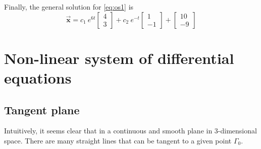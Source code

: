 \begin{solution}
    Finally, the general solution for \eqref{eq:os1} is 
    \begin{equation*}
        \overrightarrow{\mathbf{x}} = c_1 \> e^{6t} \begin{bmatrix}
            4 \\ 3
        \end{bmatrix} + c_2 \> e^{-t} \begin{bmatrix}
            1 \\ -1
        \end{bmatrix}
        + \begin{bmatrix}
            10 \\ -9
        \end{bmatrix}
    \end{equation*}
\end{solution}

\section{Non-linear system of differential equations}

\subsection{Tangent plane}

Intuitively, it seems clear that in a continuous and smooth plane in 3-dimensional space. There are many straight lines 
that can be tangent to a given point $\Gamma_0$.

